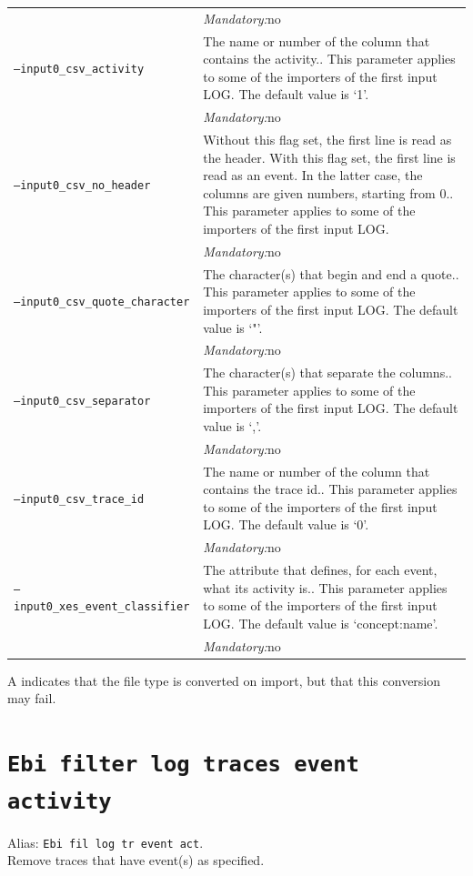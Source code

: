 {\begin{tabularx}{\linewidth}{lX}
&\textit{Mandatory:}\quad no\\
\texttt{--input0\_csv\_activity} & The name or number of the column that contains the activity.. This parameter applies to some of the importers of the first input LOG. The default value is `1'.\\
&\textit{Mandatory:}\quad no\\
\texttt{--input0\_csv\_no\_header} & Without this flag set, the first line is read as the header. 
    With this flag set, the first line is read as an event. In the latter case, the columns are given numbers, starting from 0.. This parameter applies to some of the importers of the first input LOG. \\
&\textit{Mandatory:}\quad no\\
\texttt{--input0\_csv\_quote\_character} & The character(s) that begin and end a quote.. This parameter applies to some of the importers of the first input LOG. The default value is `"'.\\
&\textit{Mandatory:}\quad no\\
\texttt{--input0\_csv\_separator} & The character(s) that separate the columns.. This parameter applies to some of the importers of the first input LOG. The default value is `,'.\\
&\textit{Mandatory:}\quad no\\
\texttt{--input0\_csv\_trace\_id} & The name or number of the column that contains the trace id.. This parameter applies to some of the importers of the first input LOG. The default value is `0'.\\
&\textit{Mandatory:}\quad no\\
\texttt{--input0\_xes\_event\_classifier} & The attribute that defines, for each event, what its activity is.. This parameter applies to some of the importers of the first input LOG. The default value is `concept:name'.\\
&\textit{Mandatory:}\quad no\\
\bottomrule
\end{tabularx}
A \textdagger{} indicates that the file type is converted on import, but that this conversion may fail.
\clearpage\section{\texttt{Ebi filter log traces event activity}}
\label{command:Ebi filter log traces event activity}
Alias: \texttt{Ebi fil log tr event act}.\\
Remove traces that have event(s) as specified.\\
}
